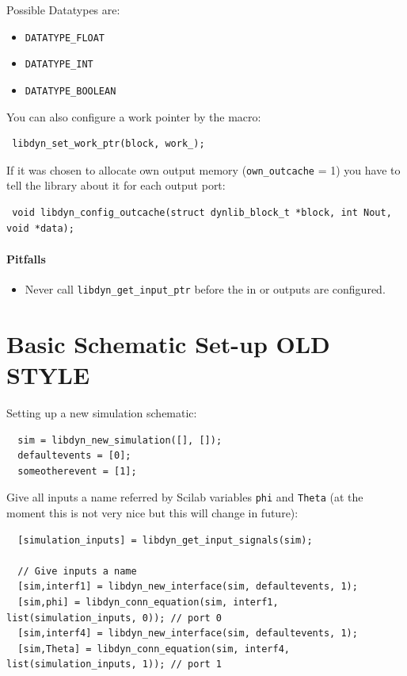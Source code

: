 \documentclass[%
	pdftex,%
	a4paper,%
	oneside,%
	11pt,%
	halfparskip,%
	headsepline,%
	bibtotocnumbered,%
	idxtotoc%
]{scrartcl}
\begin{document}
Possible Datatypes are:

\begin{itemize}
 \item \texttt{DATATYPE\_FLOAT} 
 \item \texttt{DATATYPE\_INT}
 \item \texttt{DATATYPE\_BOOLEAN}
\end{itemize}

You can also configure a work pointer by the macro:

\begin{verbatim}
 libdyn_set_work_ptr(block, work_);
\end{verbatim}

If it was chosen to allocate own output memory (\texttt{own\_outcache} = 1) you have to tell the library about it for each output port:

\begin{verbatim}
 void libdyn_config_outcache(struct dynlib_block_t *block, int Nout,  void *data);
\end{verbatim}



\paragraph{Pitfalls}

\begin{itemize}
 \item Never call \texttt{libdyn\_get\_input\_ptr} before the in or outputs are configured.
\end{itemize}




\section{Basic Schematic Set-up OLD STYLE}

Setting up a new simulation schematic:

\begin{verbatim}
  sim = libdyn_new_simulation([], []);
  defaultevents = [0];
  someotherevent = [1]; 
\end{verbatim}

Give all inputs a name referred by Scilab variables \texttt{phi} and \texttt{Theta} (at the moment this is not very nice but this will change in future):

\begin{verbatim}
  [simulation_inputs] = libdyn_get_input_signals(sim);
  
  // Give inputs a name
  [sim,interf1] = libdyn_new_interface(sim, defaultevents, 1);
  [sim,phi] = libdyn_conn_equation(sim, interf1, list(simulation_inputs, 0)); // port 0
  [sim,interf4] = libdyn_new_interface(sim, defaultevents, 1);
  [sim,Theta] = libdyn_conn_equation(sim, interf4, list(simulation_inputs, 1)); // port 1
\end{verbatim}
\end{document}
